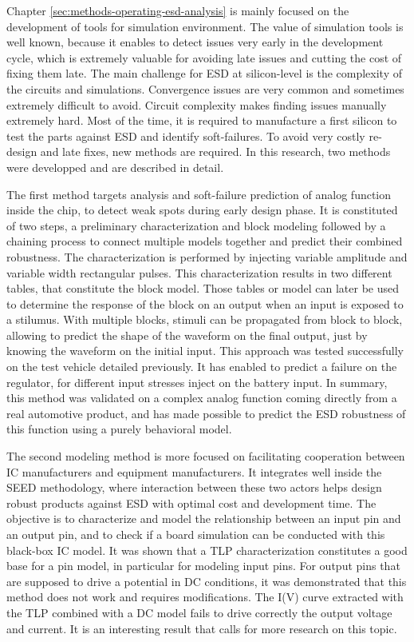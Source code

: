Chapter \ref{sec:methods-operating-esd-analysis} is mainly focused on the development of tools for simulation environment.
The value of simulation tools is well known, because it enables to detect issues very early in the development cycle, which is extremely valuable for avoiding late issues and cutting the cost of fixing them late.
The main challenge for ESD at silicon-level is the complexity of the circuits and simulations.
Convergence issues are very common and sometimes extremely difficult to avoid.
Circuit complexity makes finding issues manually extremely hard.
Most of the time, it is required to manufacture a first silicon to test the parts against ESD and identify soft-failures.
To avoid very costly re-design and late fixes, new methods are required.
In this research, two methods were developped and are described in detail.

The first method targets analysis and soft-failure prediction of analog function inside the chip, to detect weak spots during early design phase.
It is constituted of two steps, a preliminary characterization and block modeling followed by a chaining process to connect multiple models together and predict their combined robustness.
The characterization is performed by injecting variable amplitude and variable width rectangular pulses.
This characterization results in two different tables, that constitute the block model.
Those tables or model can later be used to determine the response of the block on an output when an input is exposed to a stilumus.
With multiple blocks, stimuli can be propagated from block to block, allowing to predict the shape of the waveform on the final output, just by knowing the waveform on the initial input.
This approach was tested successfully on the test vehicle detailed previously.
It has enabled to predict a failure on the regulator, for different input stresses inject on the battery input.
In summary, this method was validated on a complex analog function coming directly from a real automotive product, and has made possible to predict the ESD robustness of this function using a purely behavioral model.

The second modeling method is more focused on facilitating cooperation between IC manufacturers and equipment manufacturers.
It integrates well inside the SEED methodology, where interaction between these two actors helps design robust products against ESD with optimal cost and development time.
The objective is to characterize and model the relationship between an input pin and an output pin, and to check if a board simulation can be conducted with this black-box IC model.
It was shown that a TLP characterization constitutes a good base for a pin model, in particular for modeling input pins.
For output pins that are supposed to drive a potential in DC conditions, it was demonstrated that this method does not work and requires modifications.
The I(V) curve extracted with the TLP combined with a DC model fails to drive correctly the output voltage and current.
It is an interesting result that calls for more research on this topic.

